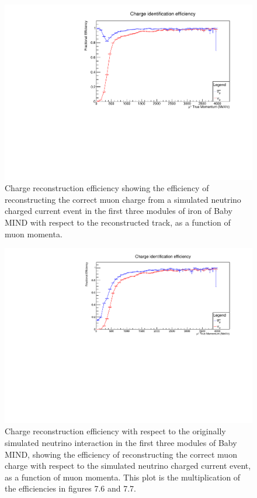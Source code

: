 \begin{figure}[h!]
\centering
\includegraphics[width=.9\textwidth]{figures/NeutrinoChap/Neutrino/T2KIronChargeEff.pdf}
\caption{Charge reconstruction efficiency showing the efficiency of reconstructing the correct muon charge from a simulated neutrino charged current event in the first three modules of iron of Baby MIND with respect to the reconstructed track, as a function of muon momenta.}
\label{fig:IronMINDfittedcharge}
\end{figure}

\begin{figure}[h!]
\centering
\includegraphics[width=.9\textwidth]{figures/NeutrinoChap/NuFactTalk/fix3.pdf}
\caption{Charge reconstruction efficiency with respect to the originally simulated neutrino interaction in the first three modules of Baby MIND, showing the efficiency of reconstructing the correct muon charge with respect to the simulated neutrino charged current event, as a function of muon momenta. This plot is the multiplication of the efficiencies in figures 7.6 and 7.7. }
\label{fig:IronMINDCombined}
\end{figure}

